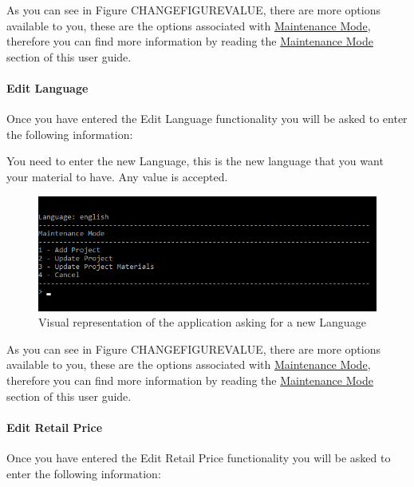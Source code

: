 \documentclass[
  english,
  a4paper,
,tablecaptionabove
]{scrartcl}
\begin{document}
As you can see in Figure CHANGEFIGUREVALUE, there are more options
available to you, these are the options associated with
\protect\hyperlink{using-maintenance-mode}{Maintenance Mode}, therefore
you can find more information by reading the
\protect\hyperlink{using-maintenance-mode}{Maintenance Mode} section of
this user guide.

\newpage

\hypertarget{edit-language}{%
\paragraph{Edit Language}\label{edit-language}}

Once you have entered the Edit Language functionality you will be asked
to enter the following information:

You need to enter the new Language, this is the new language that you
want your material to have. Any value is accepted.

\begin{figure}
\centering
\includegraphics{images/user-guide/maintenance-mode/update-project-material-language.png}
\caption{Visual representation of the application asking for a new
Language}
\end{figure}

As you can see in Figure CHANGEFIGUREVALUE, there are more options
available to you, these are the options associated with
\protect\hyperlink{using-maintenance-mode}{Maintenance Mode}, therefore
you can find more information by reading the
\protect\hyperlink{using-maintenance-mode}{Maintenance Mode} section of
this user guide.

\newpage

\hypertarget{edit-retail-price}{%
\paragraph{Edit Retail Price}\label{edit-retail-price}}

Once you have entered the Edit Retail Price functionality you will be
asked to enter the following information:
\end{document}
